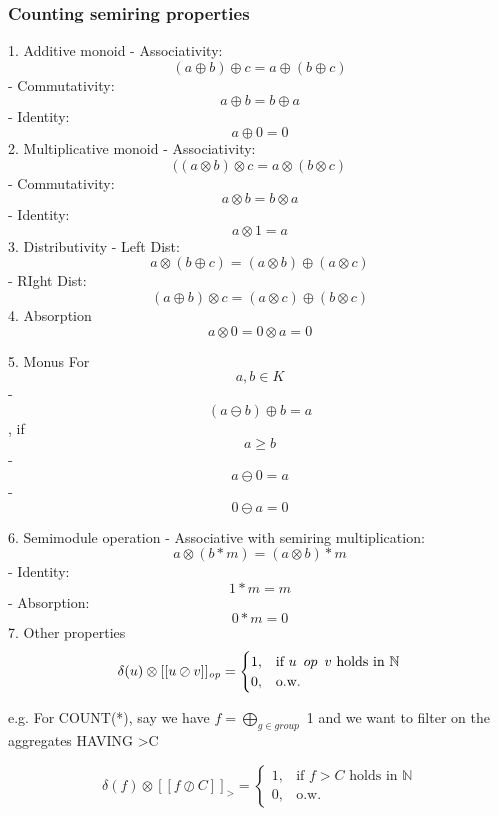 \documentclass{article}
\begin{document}
\subsubsection{Counting semiring properties}
1. Additive monoid
- Associativity: $$(a \oplus b) \oplus c = a \oplus (b\oplus c)$$
- Commutativity: $$a \oplus b = b \oplus a$$
- Identity: $$a \oplus 0 = 0$$
2. Multiplicative monoid
- Associativity: $$( (a \otimes b) \otimes c = a \otimes (b\otimes c)$$
- Commutativity: $$a \otimes b = b \otimes a$$
- Identity: $$a \otimes 1 = a$$
3. Distributivity
- Left Dist: $$a \otimes (b \oplus c)= (a \otimes b)\oplus(a \otimes c)$$
- RIght Dist: $$(a \oplus b)\otimes c=(a \otimes c)\oplus(b \otimes c)$$
 4. Absorption
$$a \otimes 0 = 0 \otimes a = 0$$

5. Monus \newline
For $$a, b \in K$$
- $$(a \ominus b) \oplus b =a$$, if $$a \geq b$$
- $$a \ominus 0 =a$$
- $$0 \ominus a = 0$$

6. Semimodule operation
- Associative with semiring multiplication: $$a \otimes (b * m)= (a \otimes b) * m$$
- Identity: $$1*m=m$$
- Absorption: $$0*m=0$$
7. Other properties
$$
 \delta(u)\otimes[[u \oslash   v]]_{\mathit{op}}=\begin{cases}1, & \text{if } u\hspace{0.5em} op\hspace{0.5em} v \text{ holds in } \mathbb{N} \\
0,&\text{o.w.}\end{cases}
$$

e.g. For COUNT(*), say we have $f=\bigoplus_{g \in group}$ 1 and we want to filter on the aggregates HAVING >C

$$
 \delta(f)\otimes[[f \oslash   C]]_{\mathit{>}}=\begin{cases}1, & \text{if } f>C \text{ holds in } \mathbb{N} \\
0,&\text{o.w.}\end{cases}
$$







\end{document}
